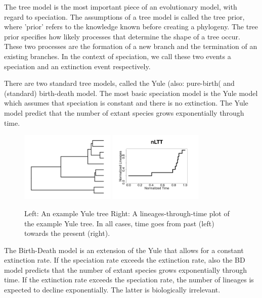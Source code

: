The tree model is the most important piece of an evolutionary model,
with regard to speciation. The assumptions of a tree model is 
called the tree prior, where 'prior' refers to the knowledge
known before creating a phylogeny. The tree prior specifies how likely
processes that determine the shape of a tree occur. These
two processes are the formation of a new branch and the termination of
an existing branches. In the context of speciation, we call these
two events a speciation and an extinction event respectively.

There are two standard tree models, called the Yule (also: pure-birth(
and (standard) birth-death model. The most basic speciation model
is the Yule model \cite{yule1925mathematical} which assumes that speciation
is constant and there is no extinction.
The Yule model predict that the number of extant species
grows exponentially through time.

\begin{figure}[H]
  \includegraphics[width=0.4\textwidth]{yule_tree.png}
  \includegraphics[width=0.4\textwidth]{yule_tree_nltt.png}
  \caption{
    Left: An example Yule tree
    Right: A lineages-through-time plot of the example Yule tree.
    In all cases, time goes from past (left) towards the present (right).
  }
  \label{fig:yule}
\end{figure}

The Birth-Death model \cite{nee1994} is an extension of the
Yule that allows for a constant extinction rate. 
If the speciation rate exceeds the extinction rate,
also the BD model predicts that the number of extant species
grows exponentially through time. If the extinction rate exceeds
the speciation rate, the number of lineages is expected to decline
exponentially. The latter is biologically irrelevant.

